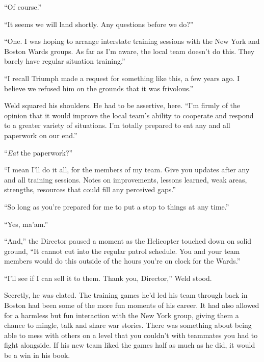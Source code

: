 ``Of course.''



``It seems we will land shortly.  Any questions before we do?''



``One.  I was hoping to arrange interstate training sessions with the New York and Boston Wards groups.  As far as I'm aware, the local team doesn't do this.  They barely have regular situation training.''



``I recall Triumph made a request for something like this, a few years ago.  I believe we refused him on the grounds that it was frivolous.''



Weld squared his shoulders.  He had to be assertive, here. ``I'm firmly of the opinion that it would improve the local team's ability to cooperate and respond to a greater variety of situations.  I'm totally prepared to eat any and all paperwork on our end.''



``\emph{Eat} the paperwork?''



``I mean I'll do it all, for the members of my team.  Give you updates after any and all training sessions.  Notes on improvements, lessons learned, weak areas, strengths, resources that could fill any perceived gaps.''



``So long as you're prepared for me to put a stop to things at any time.''



``Yes, ma'am.''



``And,'' the Director paused a moment as the Helicopter touched down on solid ground, ``It cannot cut into the regular patrol schedule.  You and your team members would do this outside of the hours you're on clock for the Wards.''



``I'll see if I can sell it to them.  Thank you, Director,'' Weld stood.



Secretly, he was elated.  The training games he'd led his team through back in Boston had been some of the more fun moments of his career.  It had also allowed for a harmless but fun interaction with the New York group, giving them a chance to mingle, talk and share war stories.  There was something about being able to mess with others on a level that you couldn't with teammates you had to fight alongside.  If his new team liked the games half as much as he did, it would be a win in his book.



